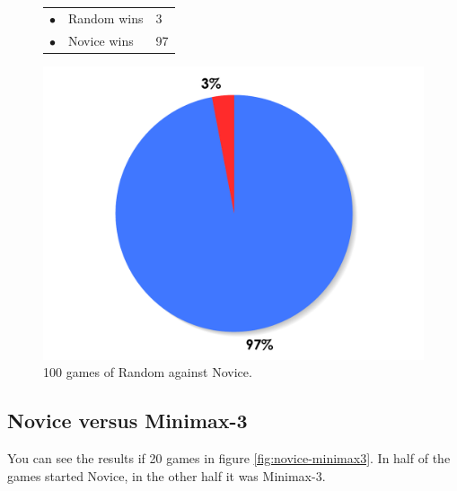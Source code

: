 \documentclass[paper=a4, fontsize=11pt]{article} %
\newcommand{\ra}[1]{\renewcommand{\arraystretch}{#1}}
\begin{document}
\begin{figure}[ht]
    \begin{minipage}[c]{0.40\linewidth}
        \centering
        \ra{1.3}
        \begin{tabular}{cll}
            \toprule
            \textcolor{red!100}{$\bullet$} & Random wins & 3       \\
            \textcolor{blue!100!yellow!100!red!80}{$\bullet$} & Novice wins & 97      \\  
            \bottomrule
        \end{tabular}
    \end{minipage}
    \begin{minipage}[c]{0.60\linewidth}
        \centering
        \includegraphics[scale=0.35]{img/random-novice.pdf}
    \end{minipage}
    \caption{100 games of Random against Novice.}
    \label{fig:random-novice}
\end{figure}



\subsection{Novice versus Minimax-3}
You can see the results if 20 games in figure \ref{fig:novice-minimax3}. 
In half of the games started Novice, in the other half it was Minimax-3.
\end{document}
